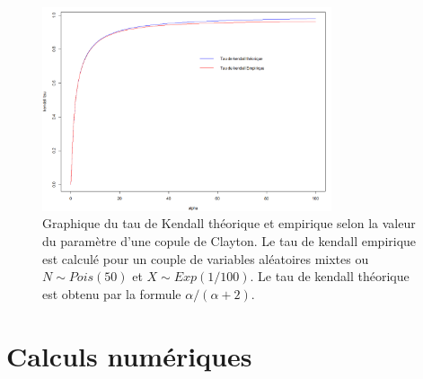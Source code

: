 \documentclass{article}
\begin{document}
	 \begin{figure}[H]
	 	\centering
	 	\includegraphics[height=6cm]{Graph/asymptotique.png}
	 	\caption[Comportement asymptotique]{Graphique du tau de Kendall théorique et empirique selon la valeur du paramètre d'une copule de Clayton. Le tau de kendall empirique est calculé pour un couple de variables aléatoires mixtes ou $N\sim Pois(50)$ et $X \sim Exp(1/100)$. Le tau de kendall théorique est obtenu par la formule $\alpha/(\alpha+2)$.} 
	 	\label{graph_asymptotique}
	 \end{figure}
 
 \newpage
 	\section{Calculs numériques}
 	
\end{document}
